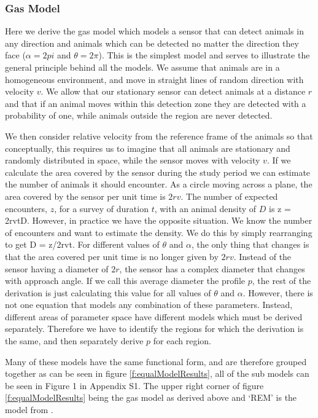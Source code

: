 \documentclass[a4paper,10pt,reqno,oneside]{amsart}
\begin{document}
\subsubsection{Gas Model}

Here we derive the gas model which models a sensor that can detect animals in any direction and animals which can be detected no matter the direction they face ($ \alpha =  2pi$ and $ \theta =  2\pi$). This is the simplest model and serves to illustrate the general principle behind all the models. We assume that animals are in a homogeneous environment, and move in straight lines of random direction with velocity $v$. We allow that our stationary sensor can detect animals at a distance $r$ and that if an animal moves within this detection zone they are detected with a probability of one, while animals outside the region are never detected.

We then consider relative velocity from the reference frame of the animals so that conceptually, this requires us to imagine that all animals are stationary and randomly distributed in space, while the sensor moves with velocity $v$. If we calculate the area covered by the sensor during the study period we can estimate the number of animals it should encounter. As a circle moving across a plane, the area covered by the sensor per unit time is $2rv$. The number of expected encounters, $z$, for a survey of duration $t$, with an animal density of $D$ is z = 2rvtD.
However, in practice we have the opposite situation. We know the number of encounters and want to estimate the density. We do this by simply rearranging to get D = z/2rvt.
For different values of $\theta$ and $\alpha$, the only thing that changes is that the area covered per unit time is no longer given by $2rv$. Instead of the sensor having a diameter of $2r$, the sensor has a complex diameter that changes with approach angle. If we call this average diameter the profile $p$, the rest of the derivation is just calculating this value for all values of $\theta$ and $\alpha$. However, there is not one equation that models any combination of these parameters. Instead, different areas of parameter space have different models which must be derived separately. Therefore we have to identify the regions for which the derivation is the same, and then separately derive $p$ for each region. 

Many of these models have the same functional form, and are therefore grouped together as can be seen in figure \ref{f:equalModelResults}, all of the sub models can be seen in Figure 1 in Appendix S1. The upper right  corner of figure \ref{f:equalModelResults} being the gas model as derived above and `REM' is the model from \cite{rowcliffe2008estimating}. 
\end{document}
